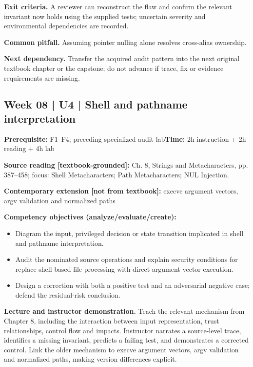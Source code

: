 \documentclass[10pt,letterpaper]{article}
\begin{document}
\textbf{Exit criteria.} A reviewer can reconstruct the flaw and confirm the relevant invariant now holds using the supplied tests; uncertain severity and environmental dependencies are recorded.

\textbf{Common pitfall.} Assuming pointer nulling alone resolves cross-alias ownership.

\textbf{Next dependency.} Transfer the acquired audit pattern into the next original textbook chapter or the capstone; do not advance if trace, fix or evidence requirements are missing.

\subsection{Week 08 | U4 | Shell and pathname interpretation}
\textbf{Prerequisite:} F1--F4; preceding specialized audit lab\hfill\textbf{Time:} 2h instruction + 2h reading + 4h lab

\textbf{Source reading [textbook-grounded]:} Ch. 8, Strings and Metacharacters, pp. 387--458; focus: Shell Metacharacters; Path Metacharacters; NUL Injection.

\textbf{Contemporary extension [not from textbook]:} execve argument vectors, argv validation and normalized paths

\textbf{Competency objectives (analyze/evaluate/create):}
\begin{itemize}[leftmargin=*,itemsep=2pt]
\item Diagram the input, privileged decision or state transition implicated in shell and pathname interpretation.
\item Audit the nominated source operations and explain security conditions for replace shell-based file processing with direct argument-vector execution.
\item Design a correction with both a positive test and an adversarial negative case; defend the residual-risk conclusion.
\end{itemize}
\textbf{Lecture and instructor demonstration.} Teach the relevant mechanism from Chapter 8, including the interaction between input representation, trust relationships, control flow and impacts. Instructor narrates a source-level trace, identifies a missing invariant, predicts a failing test, and demonstrates a corrected control. Link the older mechanism to execve argument vectors, argv validation and normalized paths, making version differences explicit.
\end{document}
